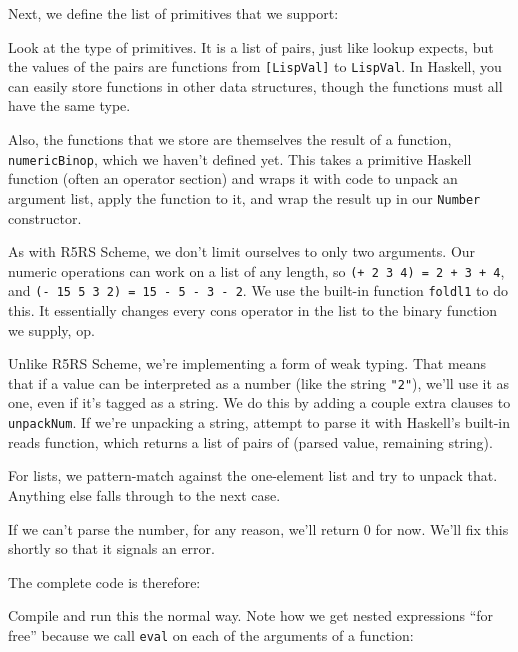 Next, we define the list of primitives that we support:
 
 
Look at the type of primitives. It is a list of pairs, just like lookup expects, but the values of the pairs are functions from \verb|[LispVal]| to \verb|LispVal|. In Haskell, you can easily store functions in other data structures, though the functions must all have the same type.
 
Also, the functions that we store are themselves the result of a function, \verb|numericBinop|, which we haven't defined yet. This takes a primitive Haskell function (often an operator section) and wraps it with code to unpack an argument list, apply the function to it, and wrap the result up in our \verb|Number| constructor.
 
 
As with R5RS Scheme, we don't limit ourselves to only two arguments. Our numeric operations can work on a list of any length, so \lstinline|(+ 2 3 4) = 2 + 3 + 4|, and \lstinline|(- 15 5 3 2) = 15 - 5 - 3 - 2|. We use the built-in function \verb|foldl1| to do this. It essentially changes every cons operator in the list to the binary function we supply, op.
 
Unlike R5RS Scheme, we're implementing a form of weak typing. That means that if a value can be interpreted as a number (like the string \verb|"2"|), we'll use it as one, even if it's tagged as a string. We do this by adding a couple extra clauses to \verb|unpackNum|. If we're unpacking a string, attempt to parse it with Haskell's built-in reads function, which returns a list of pairs of (parsed value, remaining string).
 
For lists, we pattern-match against the one-element list and try to unpack that. Anything else falls through to the next case.
 
If we can't parse the number, for any reason, we'll return 0 for now. We'll fix this shortly so that it signals an error.
 
The complete code is therefore:
 
 
Compile and run this the normal way. Note how we get nested expressions ``for free'' because we call \verb|eval| on each of the arguments of a function:
 
